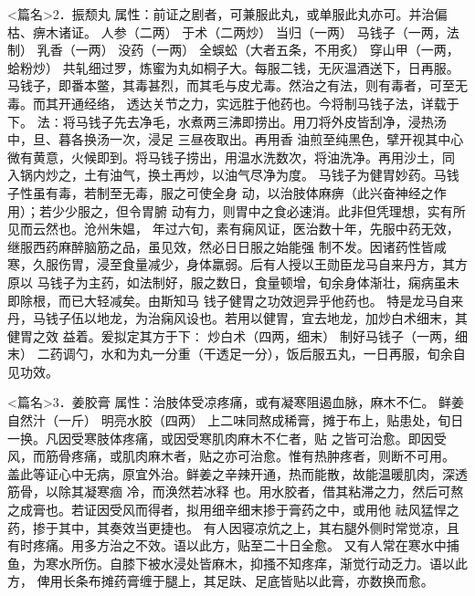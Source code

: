 \documentclass[a4paper,12pt,UTF8,twoside]{ctexbook}
\begin{document}
<篇名>2．振颓丸
属性：前证之剧者，可兼服此丸，或单服此丸亦可。并治偏枯、痹木诸证。 
人参（二两） 于术（二两炒） 当归（一两） 马钱子（一两，法制） 乳香（一两） 没药（一两） 
全蜈蚣（大者五条，不用炙） 穿山甲（一两，蛤粉炒） 
共轧细过罗，炼蜜为丸如桐子大。每服二钱，无灰温酒送下，日再服。 
马钱子，即番本鳖，其毒甚烈，而其毛与皮尤毒。然治之有法，则有毒者，可至无毒。而其开通经络， 
透达关节之力，实远胜于他药也。今将制马钱子法，详载于下。 
法∶将马钱子先去净毛，水煮两三沸即捞出。用刀将外皮皆刮净，浸热汤中，旦、暮各换汤一次，浸足 
三昼夜取出。再用香 
油煎至纯黑色，擘开视其中心微有黄意，火候即到。将马钱子捞出，用温水洗数次，将油洗净。再用沙土，同 
入锅内炒之，土有油气，换土再炒，以油气尽净为度。 
马钱子为健胃妙药。马钱子性虽有毒，若制至无毒，服之可使全身 动，以治肢体麻痹（此兴奋神经之作 
用）；若少少服之，但令胃腑 动有力，则胃中之食必速消。此非但凭理想，实有所见而云然也。沧州朱媪， 
年过六旬，素有痫风证，医治数十年，先服中药无效，继服西药麻醉脑筋之品，虽见效，然必日日服之始能强 
制不发。因诸药性皆咸寒，久服伤胃，浸至食量减少，身体羸弱。后有人授以王勋臣龙马自来丹方，其方原以 
马钱子为主药，如法制好，服之数日，食量顿增，旬余身体渐壮，痫病虽未即除根，而已大轻减矣。由斯知马 
钱子健胃之功效迥异乎他药也。 
特是龙马自来丹，马钱子伍以地龙，为治痫风设也。若用以健胃，宜去地龙，加炒白术细末，其健胃之效 
益着。爰拟定其方于下∶ 
炒白术（四两，细末） 制好马钱子（一两，细末） 
二药调勺，水和为丸一分重（干透足一分），饭后服五丸，一日再服，旬余自见功效。 


<篇名>3．姜胶膏
属性：治肢体受凉疼痛，或有凝寒阻遏血脉，麻木不仁。 
鲜姜自然汁（一斤） 明亮水胶（四两） 
上二味同熬成稀膏，摊于布上，贴患处，旬日一换。凡因受寒肢体疼痛，或因受寒肌肉麻木不仁者，贴 
之皆可治愈。即因受风，而筋骨疼痛，或肌肉麻木者，贴之亦可治愈。惟有热肿疼者，则断不可用。 
盖此等证心中无病，原宜外治。鲜姜之辛辣开通，热而能散，故能温暖肌肉，深透筋骨，以除其凝寒痼 
冷，而涣然若冰释 
也。用水胶者，借其粘滞之力，然后可熬之成膏也。若证因受风而得者，拟用细辛细末掺于膏药之中，或用他 
祛风猛悍之药，掺于其中，其奏效当更捷也。 
有人因寝凉炕之上，其右腿外侧时常觉凉，且有时疼痛。用多方治之不效。语以此方，贴至二十日全愈。 
又有人常在寒水中捕鱼，为寒水所伤。自膝下被水浸处皆麻木，抑搔不知疼痒，渐觉行动乏力。语以此方， 
俾用长条布摊药膏缠于腿上，其足趺、足底皆贴以此膏，亦数换而愈。 
\end{document}
